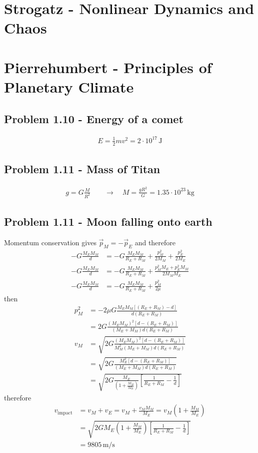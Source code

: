 \documentclass[10pt,a4paper]{book}
\theoremstyle{definition}
\begin{document}
\section{{\sc Strogatz} - Nonlinear Dynamics and Chaos}

\newpage
\section{{\sc Pierrehumbert} - Principles of Planetary Climate}
\subsection{Problem 1.10 - Energy of a comet}
\begin{align}
E=\frac{1}{2}mv^2=2\cdot 10^{17}\,\text{J}
\end{align}

\subsection{Problem 1.11 - Mass of Titan}
\begin{align}
g=G\frac{M}{R^2}\qquad\rightarrow\quad M=\frac{gR^2}{G}=1.35\cdot10^{23}\,\text{kg}
\end{align}

\subsection{Problem 1.11 - Moon falling onto earth}
Momentum conservation gives $\vec{p}_M=-\vec{p}_E$ and therefore
\begin{align}
-G\frac{M_EM_M}{d}&=-G\frac{M_EM_M}{R_E+R_M}+\frac{p_M^2}{2M_M}+\frac{p_E^2}{2M_E}\\
-G\frac{M_EM_M}{d}&=-G\frac{M_EM_M}{R_E+R_M}+\frac{p_M^2M_E+p_E^2M_M}{2M_MM_E}\\
-G\frac{M_EM_M}{d}&=-G\frac{M_EM_M}{R_E+R_M}+\frac{p_M^2}{2\mu}
\end{align}
then
\begin{align}
p_M^2&=-2\mu G\frac{M_EM_M\left[(R_E+R_M)-d\right]}{d(R_E+R_M)}\\
&=2 G\frac{(M_EM_M)^2\left[d-(R_E+R_M)\right]}{(M_E+M_M)d(R_E+R_M)}\\
v_M&=\sqrt{2 G\frac{(M_EM_M)^2\left[d-(R_E+R_M)\right]}{M_M^2(M_E+M_M)d(R_E+R_M)}}\\
&=\sqrt{2 G\frac{M_E^2\left[d-(R_E+R_M)\right]}{(M_E+M_M)d(R_E+R_M)}}\\
&=\sqrt{2 G\frac{M_E}{(1+\frac{M_M}{M_E})}\left[\frac{1}{R_E+R_M}-\frac{1}{d}\right]}
\end{align}
therefore 
\begin{align}
v_\text{impact}
&=v_M+v_E=v_M+\frac{v_MM_M}{M_E}=v_M\left(1+\frac{M_M}{M_E}\right)\\
&=\sqrt{2 GM_E\left(1+\frac{M_M}{M_E}\right)\left[\frac{1}{R_E+R_M}-\frac{1}{d}\right]}\\
&=9805\,\text{m/s}
\end{align}
\end{document}

